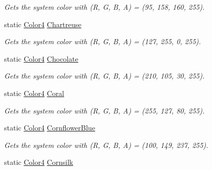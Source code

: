 \begin{DoxyCompactItemize}
\begin{DoxyCompactList}\small\item\em Gets the system color with (R, G, B, A) = (95, 158, 160, 255). \end{DoxyCompactList}\item 
static \hyperlink{struct_open_t_k_1_1_graphics_1_1_color4}{Color4} \hyperlink{struct_open_t_k_1_1_graphics_1_1_color4_ab76f4b6bd15a9328cbedcf0360746db9}{Chartreuse}
\begin{DoxyCompactList}\small\item\em Gets the system color with (R, G, B, A) = (127, 255, 0, 255). \end{DoxyCompactList}\item 
static \hyperlink{struct_open_t_k_1_1_graphics_1_1_color4}{Color4} \hyperlink{struct_open_t_k_1_1_graphics_1_1_color4_aabddfbef7fe16697458868539d7853c2}{Chocolate}
\begin{DoxyCompactList}\small\item\em Gets the system color with (R, G, B, A) = (210, 105, 30, 255). \end{DoxyCompactList}\item 
static \hyperlink{struct_open_t_k_1_1_graphics_1_1_color4}{Color4} \hyperlink{struct_open_t_k_1_1_graphics_1_1_color4_abdefbbeb00a3e635c5e74646d3253e83}{Coral}
\begin{DoxyCompactList}\small\item\em Gets the system color with (R, G, B, A) = (255, 127, 80, 255). \end{DoxyCompactList}\item 
static \hyperlink{struct_open_t_k_1_1_graphics_1_1_color4}{Color4} \hyperlink{struct_open_t_k_1_1_graphics_1_1_color4_ab288312edaec7b58164aa0a4631aa777}{Cornflower\-Blue}
\begin{DoxyCompactList}\small\item\em Gets the system color with (R, G, B, A) = (100, 149, 237, 255). \end{DoxyCompactList}\item 
static \hyperlink{struct_open_t_k_1_1_graphics_1_1_color4}{Color4} \hyperlink{struct_open_t_k_1_1_graphics_1_1_color4_a09fdbf67e7e0b5566a49fc6e82082d16}{Cornsilk}

\end{DoxyCompactItemize}
